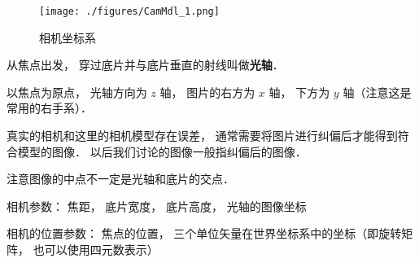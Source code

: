 
\begin{figure}[ht]
\centering
\texttt{[image: ./figures/CamMdl\_1.png]}
\caption{相机坐标系} \label{CamMdl_fig1}
\end{figure}

从焦点出发， 穿过底片并与底片垂直的射线叫做\textbf{光轴}．

以焦点为原点， 光轴方向为 $z$ 轴， 图片的右方为 $x$ 轴， 下方为 $y$ 轴（注意这是常用的右手系）．

真实的相机和这里的相机模型存在误差， 通常需要将图片进行纠偏后才能得到符合模型的图像． 以后我们讨论的图像一般指纠偏后的图像．

注意图像的中点不一定是光轴和底片的交点．

相机参数： 焦距， 底片宽度， 底片高度， 光轴的图像坐标

相机的位置参数： 焦点的位置， 三个单位矢量在世界坐标系中的坐标（即旋转矩阵， 也可以使用四元数表示）

